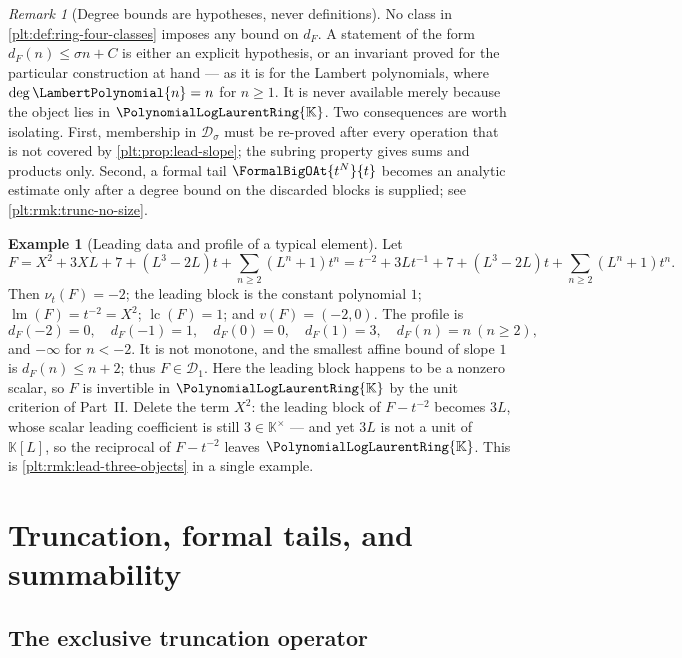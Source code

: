 \documentclass[11pt,oneside]{article}
\theoremstyle{plain}
\theoremstyle{definition}
\newtheorem{example}[theorem]{Example}
\theoremstyle{remark}
\newtheorem{remark}[theorem]{Remark}
\newcommand{\K}{\mathbb{K}}
\newcommand{\PLlau}{\PolynomialLogLaurentRing{\K}}       %
\newcommand{\ordt}{\nu_{t}}                              %
\DeclareMathOperator{\lm}{lm}
\DeclareMathOperator{\lc}{lc}
\newcommand{\LamP}[1]{\LambertPolynomial{#1}}
\newcommand{\dprofile}[1]{d_{#1}}                        %
\begin{document}
\begin{remark}[Degree bounds are hypotheses, never definitions]
\label{plt:rmk:lead-no-degree-bound}
No class in \cref{plt:def:ring-four-classes} imposes any bound on
\(\dprofile{F}\).  A statement of the form \(\dprofile{F}(n)\le\sigma n+C\) is
either an explicit hypothesis, or an invariant proved for the particular
construction at hand --- as it is for the Lambert polynomials, where
\(\deg\LamP{n}=n\) for \(n\ge1\).  It is never available merely because the
object lies in \(\PLlau\).  Two consequences are worth isolating.  First,
membership in \(\mathcal D_\sigma\) must be re-proved after every operation
that is not covered by \cref{plt:prop:lead-slope}; the subring property gives
sums and products only.  Second, a formal tail \(\FormalBigOAt{t^N}{t}\)
becomes an analytic estimate only after a degree bound on the discarded
blocks is supplied; see \cref{plt:rmk:trunc-no-size}.
\end{remark}

\begin{example}[Leading data and profile of a typical element]
\label{plt:ex:lead-worked}
Let
\[
  F=X^2+3XL+7+(L^3-2L)t+\sum_{n\ge2}(L^n+1)t^n
   =t^{-2}+3Lt^{-1}+7+(L^3-2L)t+\sum_{n\ge2}(L^n+1)t^n .
\]
Then \(\ordt(F)=-2\); the leading block is the constant polynomial \(1\);
\(\lm(F)=t^{-2}=X^2\); \(\lc(F)=1\); and \(v(F)=(-2,0)\).  The profile is
\[
  \dprofile{F}(-2)=0,\quad
  \dprofile{F}(-1)=1,\quad
  \dprofile{F}(0)=0,\quad
  \dprofile{F}(1)=3,\quad
  \dprofile{F}(n)=n\ (n\ge2),
\]
and \(-\infty\) for \(n<-2\).  It is not monotone, and the smallest affine
bound of slope \(1\) is \(\dprofile{F}(n)\le n+2\); thus
\(F\in\mathcal D_1\).  Here the leading block happens to be a nonzero scalar,
so \(F\) is invertible in \(\PLlau\) by the unit criterion of Part~II.  Delete
the term \(X^2\): the leading block of \(F-t^{-2}\) becomes \(3L\), whose
scalar leading coefficient is still \(3\in\K^\times\) --- and yet \(3L\) is not
a unit of \(\K[L]\), so the reciprocal of \(F-t^{-2}\) leaves \(\PLlau\).
This is \cref{plt:rmk:lead-three-objects} in a single example.
\end{example}

\section{Truncation, formal tails, and summability}
\label{plt:sec:truncation}

\subsection{The exclusive truncation operator}
\label{plt:sec:trunc-operator}
\end{document}
